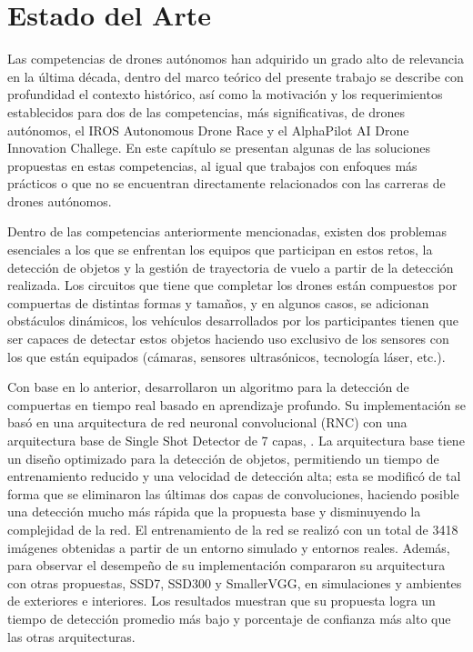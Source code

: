 \chapter{Estado del Arte}

Las competencias de drones autónomos han adquirido un grado alto de relevancia en la última década, dentro del marco teórico del presente trabajo se describe con profundidad el contexto histórico, así como la motivación y los requerimientos establecidos para dos de las competencias, más significativas, de drones autónomos, el  IROS Autonomous Drone Race y el AlphaPilot AI Drone Innovation Challege. 
En este capítulo se presentan algunas de las soluciones propuestas en estas competencias, al igual que trabajos con enfoques más prácticos o que no se encuentran directamente relacionados con las carreras de drones autónomos.

Dentro de las competencias anteriormente mencionadas, existen dos problemas esenciales a los que se enfrentan los equipos que participan en estos retos, la detección de objetos y la gestión de trayectoria de vuelo a partir de la detección realizada. 
Los circuitos que tiene que completar los drones están compuestos por compuertas de distintas formas y tamaños, y en algunos casos, se adicionan obstáculos dinámicos, los vehículos desarrollados por los participantes tienen que ser capaces de detectar estos objetos haciendo uso exclusivo de los sensores con los que están equipados (cámaras, sensores ultrasónicos, tecnología láser, etc.).

Con base en lo anterior, \citet{cabrera2019gate} desarrollaron un algoritmo para la detección de compuertas en tiempo real basado en aprendizaje profundo. Su implementación se basó en una arquitectura de red neuronal convolucional (RNC) con una arquitectura base de Single Shot Detector de 7 capas, \citet{SSD7}. La arquitectura base tiene un diseño optimizado para la detección de objetos, permitiendo un tiempo de entrenamiento reducido y una velocidad de detección alta; esta se modificó de tal forma que se eliminaron las últimas dos capas de convoluciones, haciendo posible una detección mucho más rápida que la propuesta base y disminuyendo la complejidad de la red. El entrenamiento de la red se realizó con un total de 3418 imágenes obtenidas a partir de un entorno simulado y entornos reales. 
Además, para observar el desempeño de su implementación compararon su arquitectura con otras propuestas, SSD7, SSD300 y SmallerVGG, en simulaciones y ambientes de exteriores e interiores. Los resultados muestran que su propuesta logra un tiempo de detección promedio más bajo y porcentaje de confianza más alto que las otras arquitecturas. 

